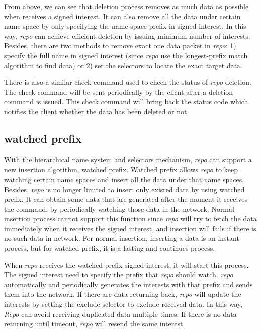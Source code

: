 \documentclass[conference]{IEEEtran}
\begin{document}
From above, we can see that deletion process removes as much data as possible when receives a signed interest. It can also remove all the data under certain name space by only specifying the name space prefix in signed interest. In this way, \emph{repo} can achieve efficient deletion by issuing minimum number of interests. Besides, there are two methods to remove exact one data packet in \emph{repo}: 1) specify the full name in signed interest (since \emph{repo} use the longest-prefix match algorithm to find data) or 2) set the selectors to locate the exact target data.

There is also a similar check command used to check the status of \emph{repo} deletion. The check command will be sent periodically by the client after a deletion command is issued. This check command will bring back the status code which notifies the client whether the data has been deleted or not.

\subsection{watched prefix}

With the hierarchical name system and selectors mechanism, \emph{repo} can support a new insertion algorithm, watched prefix. Watched prefix allows \emph{repo} to keep watching certain name spaces and insert all the data under that name spaces. Besides, \emph{repo} is no longer limited to insert only existed data by using watched prefix. It can obtain some data that are generated after the moment it receives the command, by periodically watching those data in the network. Normal insertion process cannot support this function since \emph{repo} will try to fetch the data immediately when it receives the signed interest, and insertion will fails if there is no such data in network. For normal insertion, inserting a data is an instant process, but for watched prefix, it is a lasting and continues process.

When \emph{repo} receives the watched prefix signed interest, it will start this process. The signed interest need to specify the prefix that \emph{repo} should watch. \emph{repo} automatically and periodically generates the interests with that prefix and sends them into the network. If there are data returning back, \emph{repo} will update the interests by setting the exclude selector to exclude received data. In this way, \emph{Repo} can avoid receiving duplicated data multiple times. If there is no data returning until timeout, \emph{repo} will resend the same interest.
\end{document}
